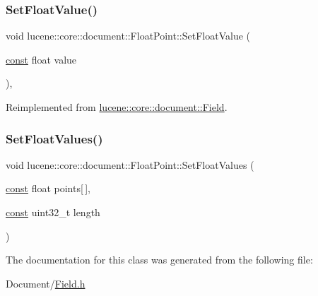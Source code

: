 \subsubsection{\texorpdfstring{Set\+Float\+Value()}{SetFloatValue()}}
{\footnotesize\ttfamily void lucene\+::core\+::document\+::\+Float\+Point\+::\+Set\+Float\+Value (\begin{DoxyParamCaption}\item[{\mbox{\hyperlink{ZlibCrc32_8h_a2c212835823e3c54a8ab6d95c652660e}{const}} float}]{value }\end{DoxyParamCaption})\hspace{0.3cm}{\ttfamily [inline]}, {\ttfamily [virtual]}}



Reimplemented from \mbox{\hyperlink{classlucene_1_1core_1_1document_1_1Field_aa22291dffcf6a545fd6c24f23fbb8b50}{lucene\+::core\+::document\+::\+Field}}.

\mbox{\label{classlucene_1_1core_1_1document_1_1FloatPoint_a37fb83ede21d310e7bda0cbd072650b4}} 
\subsubsection{\texorpdfstring{Set\+Float\+Values()}{SetFloatValues()}}
{\footnotesize\ttfamily void lucene\+::core\+::document\+::\+Float\+Point\+::\+Set\+Float\+Values (\begin{DoxyParamCaption}\item[{\mbox{\hyperlink{ZlibCrc32_8h_a2c212835823e3c54a8ab6d95c652660e}{const}} float}]{points\mbox{[}$\,$\mbox{]},  }\item[{\mbox{\hyperlink{ZlibCrc32_8h_a2c212835823e3c54a8ab6d95c652660e}{const}} uint32\+\_\+t}]{length }\end{DoxyParamCaption})\hspace{0.3cm}{\ttfamily [inline]}}



The documentation for this class was generated from the following file\+:\begin{DoxyCompactItemize}
\item 
Document/\mbox{\hyperlink{Document_2Field_8h}{Field.\+h}}\end{DoxyCompactItemize}

